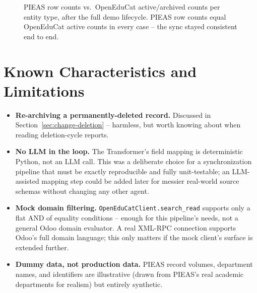 \documentclass[11pt,a4paper]{article}
\begin{document}
\begin{figure}[H]
\centering
{}
\caption{PIEAS row counts vs.\ OpenEduCat active/archived counts per entity type, after the full
demo lifecycle. PIEAS row counts equal OpenEduCat active counts in every case -- the sync stayed
consistent end to end.}
\label{fig:entitychart}
\end{figure}

\section{Known Characteristics and Limitations}

\begin{itemize}[leftmargin=1.4em]
    \item \textbf{Re-archiving a permanently-deleted record.} Discussed in
          Section~\ref{sec:change-deletion} -- harmless, but worth knowing about when reading
          deletion-cycle reports.
    \item \textbf{No LLM in the loop.} The Transformer's field mapping is deterministic
          Python, not an LLM call. This was a deliberate choice for a synchronization pipeline
          that must be exactly reproducible and fully unit-testable; an LLM-assisted mapping
          step could be added later for messier real-world source schemas without changing any
          other agent.
    \item \textbf{Mock domain filtering.} \texttt{OpenEduCatClient.search\_read} supports only a
          flat AND of equality conditions -- enough for this pipeline's needs, not a general
          Odoo domain evaluator. A real XML-RPC connection supports Odoo's full domain
          language; this only matters if the mock client's surface is extended further.
    \item \textbf{Dummy data, not production data.} PIEAS record volumes, department names, and
          identifiers are illustrative (drawn from PIEAS's real academic departments for
          realism) but entirely synthetic.
\end{itemize}
\end{document}
